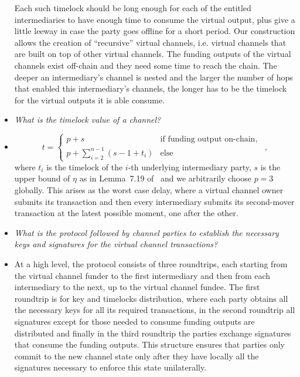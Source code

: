 \begin{itemize}
  Each such timelock should be long enough for each of the entitled
  intermediaries to have enough time to consume the virtual output, plus give a
  little leeway in case the party goes offline for a short period. Our
  construction allows the creation of ``recursive'' virtual channels, i.e.
  virtual channels that are built on top of other virtual channels. The funding
  outputs of the virtual channels exist off-chain and they need some time to
  reach the chain. The deeper an intermediary's channel is nested and the larger
  the number of hops that enabled this intermediary's channels, the longer has
  to be the timelock for the virtual outputs it is able consume.
  \item \emph{What is the timelock value of a channel?}
  \item
  \begin{equation}
    t =
      \begin{cases}
        p + s & \mbox{if funding output on-chain}, \\
        p + \sum\limits_{i = 2}^{n-1}(s - 1 + t_i) & \mbox{else}
      \end{cases} \enspace,
  \end{equation}
  where $t_i$ is the timelock of the $i$-th underlying intermediary party, $s$
  is the upper bound of $\eta$ as in Lemma~7.19 of~\cite{BMTZ17} and we
  arbitrarily choose $p = 3$ globally. This arises as the worst case delay,
  where a virtual channel owner submits its transaction and then every
  intermediary submits its second-mover transaction at the latest possible
  moment, one after the other.
  \item \emph{What is the protocol followed by channel parties to establish the
  necessary keys and signatures for the virtual channel transactions?}
  \item At a high level, the protocol consists of three roundtrips, each
  starting from the virtual channel funder to the first intermediary and then
  from each intermediary to the next, up to the virtual channel fundee. The
  first roundtrip is for key and timelocks distribution, where each party
  obtains all the necessary keys for all its required transactions, in the
  second roundtrip all signatures except for those needed to consume funding
  outputs are distributed and finally in the third roundtrip the parties
  exchange signatures that consume the funding outputs. This structure ensures
  that parties only commit to the new channel state only after they have locally
  all the signatures necessary to enforce this state unilaterally.
\end{itemize}
